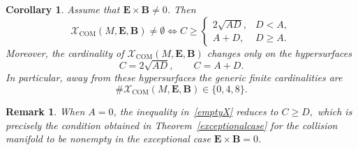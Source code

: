 \documentclass[10pt,a4paper]{amsart}
\newtheorem{corollary}[theorem]{Corollary}
\newtheorem{remark}[theorem]{Remark}
\begin{document}
\begin{corollary}\label{nonemptycondition}
Assume that ${\bm E}\times{\bm B}\neq0$. Then
\begin{equation}\label{emptyX}
\mathcal X_{\mathrm{COM}}(M,{\bm E},{\bm B})\neq\emptyset
\iff
C\ge
\begin{cases}
2\sqrt{AD}, & D<A,\\
A+D, & D\ge A.
\end{cases}
\end{equation}
Moreover, the cardinality of $\mathcal X_{\mathrm{COM}}(M,{\bm E},{\bm B})$ changes only on the hypersurfaces
\[
C=2\sqrt{AD},
\qquad
C=A+D.
\]
In particular, away from these hypersurfaces the generic finite cardinalities are
\[
\#\mathcal X_{\mathrm{COM}}(M,{\bm E},{\bm B})\in\{0,4,8\}.
\]
\end{corollary}
\begin{remark}
When $A=0$, the inequality in~\eqref{emptyX} reduces to
$
C\ge D,
$
which is precisely the condition obtained in Theorem~\ref{exceptionalcase}
for the collision manifold to be nonempty in the exceptional case
${\bm E}\times{\bm B}=0$.
\end{remark}
\end{document}
